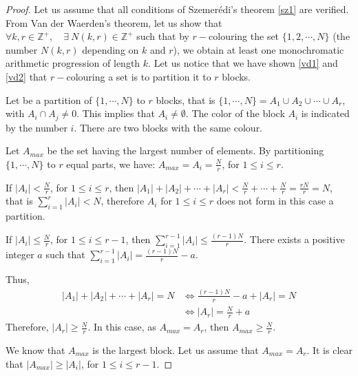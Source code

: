 \begin{proof}
  Let us assume that all conditions of Szemerédi's theorem \eqref{sz1} are verified.  From Van der Waerden's theorem, let us show that $\forall k, r \in \mathbb{Z}^+, \quad \exists\  N(k,r) \in \mathbb{Z}^+ $ such that by $r-$colouring the set $\{1,2,\cdots, N\}$ (the number $N(k,r)$ depending on $k$ and $r$), we obtain at least one monochromatic arithmetic progression of length $k.$ Let us notice that we have shown \eqref{vd1} and \eqref{vd2} that $r-$colouring a set  is to partition it to $r$ blocks.

  Let be a partition of $\{1, \cdots, N\}$ to $r$ blocks, that is $ \{1, \cdots, N\} =A_1 \cup A_2 \cup \cdots \cup A_r$, with $A_i \cap A_j \neq 0.$ This implies that $A_i \neq \emptyset.$ The color of the block $A_i$ is indicated by the number $i$. There are two blocks with the same colour.

  Let $A_{max}$ be the set having the largest number of elements. By partitioning $\{1, \cdots, N\}$ to $r$ equal parts, we have: $A_{max}=A_i=\frac{N}{r}$, for $1\leq i \leq r.$

  If $|A_i| < \frac{N}{r}$, for $1\leq i \leq r$, then $|A_1|+|A_2|+ \cdots +|A_r| < \frac{N}{r}+\cdots +\frac{N}{r}=\frac{rN}{r}=N$, that is $\displaystyle{ \sum_{i=1}^{r}|A_i|<N}$, therefore $A_i$ for $1\leq i \leq r$ does not form in this case a partition.

  If $|A_i| \leq  \frac{N}{r}$, for $1\leq i \leq r-1$, then $\displaystyle{ \sum_{i=1}^{r-1}|A_i|\leq  \frac{(r-1)N}{r}}.$ There exists a positive integer $a$ such that  $\displaystyle{ \sum_{i=1}^{r-1}|A_i|=\frac{(r-1)N}{r}}-a.$

Thus, \begin{align*}
|A_1|+|A_2|+ \cdots +|A_r|=N & \Longleftrightarrow \frac{(r-1)N}{r}-a+|A_r|=N \\
&  \Longleftrightarrow |A_r|= \frac{N}{r}+a
\end{align*} 
Therefore, $|A_r| \geq \frac{N}{r}.$ In this case, as  $A_{max}=A_r$, then $A_{max}\geq \frac{N}{r}.$

We know that $A_{max}$ is the largest block. Let us assume that $A_{max}=A_r.$ It is clear that $|A_{max}| \geq |A_i|$, for $1\leq i \leq r-1.$


\end{proof}

